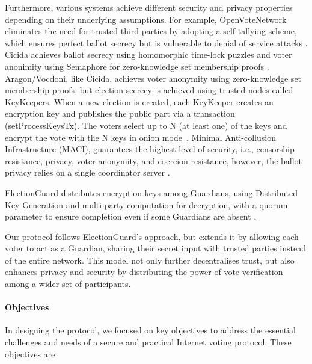 \documentclass[runningheads]{llncs}
\begin{document}
Furthermore, various systems achieve different security and privacy properties depending on their underlying assumptions. For example, OpenVoteNetwork eliminates the need for trusted third parties by adopting a self-tallying scheme, which ensures perfect ballot secrecy but is vulnerable to denial of service attacks \cite{haoAnonymousVotingTworound2010, mccorrySmartContractBoardroom2017, seifelnasrScalableOpenVoteNetwork2020, elsheikhDisputefreeScalableOpen2022}. Cicida achieves ballot secrecy using homomorphic time-lock puzzles and voter anonimity using Semaphore for zero-knowledge set membership proofs \cite{BuildingCicadaPrivate, A16zCicada2023}. Aragon/Vocdoni, like Cicida, achieves voter anonymity using zero-knowledge set membership proofs, but election secrecy is achieved using trusted nodes called KeyKeepers. When a new election is created, each KeyKeeper creates an encryption key and publishes the public part via a transaction (setProcessKeysTx). The voters select up to N (at least one) of the keys and encrypt the vote with the N keys in onion mode~\cite{williamsRemoteVotingAge2022, VocdoniIntroductionVocdoni}. Minimal Anti-collusion Infrastructure (MACI), guarantees the highest level of security, i.e., censorship resistance, privacy, voter anonymity, and coercion resistance, however, the ballot privacy relies on a single coordinator server \cite{ethereumfoundationMinimalAntiCollusionInfrastructure2022, PrivacyscalingexplorationsMaci2023}.

ElectionGuard distributes encryption keys among Guardians, using Distributed Key Generation and multi-party computation for decryption, with a quorum parameter to ensure completion even if some Guardians are absent \cite{benalohElectionGuardDesignSpecification2023}.

Our protocol follows ElectionGuard's approach, but extends it by allowing each voter to act as a Guardian, sharing their secret input with trusted parties instead of the entire network. This model not only further decentralises trust, but also enhances privacy and security by distributing the power of vote verification among a wider set of participants. 


\paragraph{Objectives}
In designing the protocol, we focused on key objectives to address the essential challenges and needs of a secure and practical Internet voting protocol. These objectives are
\end{document}
